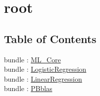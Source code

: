 \chapter*{root}
\hypertarget{}{}


\section*{Table of Contents}
bundle : \hyperlink{ML_Core}{ML\_Core}   \\
bundle : \hyperlink{LogisticRegression}{LogisticRegression}   \\
bundle : \hyperlink{LinearRegression}{LinearRegression}   \\
bundle : \hyperlink{PBblas}{PBblas}   \\





